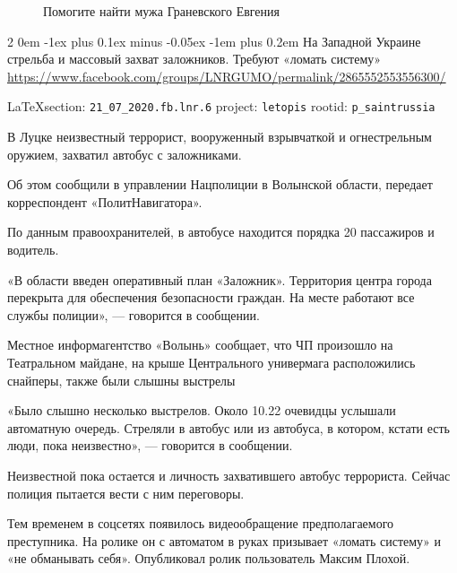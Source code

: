 \documentclass[a4paper,11pt]{extreport}
\makeatletter
\renewcommand\subsection{%
  \clearpage
    \@startsection{subsection}%
    {2}%
    {0em}%
    {-1ex plus 0.1ex minus -0.05ex}%
    {-1em plus 0.2em}%
    {\scshape\bfseries\Large}%
}
\makeatother
\begin{document}
\begin{figure}[ht]
 \centering
 \caption{Помогите найти мужа Граневского Евгения}
 \label{fig:}
\end{figure}
 
 
\subsection{На Западной Украине стрельба и массовый захват заложников. Требуют «ломать систему»}
\label{sec:21_07_2020.fb.lnr.6}
\url{https://www.facebook.com/groups/LNRGUMO/permalink/2865552553556300/}
  
\vspace{0.5cm}
{\small\LaTeX section: \verb|21_07_2020.fb.lnr.6| project: \verb|letopis| rootid: \verb|p_saintrussia|}
\vspace{0.5cm}


В Луцке неизвестный террорист, вооруженный взрывчаткой и огнестрельным оружием,
захватил автобус с заложниками.

Об этом сообщили в управлении Нацполиции в Волынской области, передает
корреспондент «ПолитНавигатора».

По данным правоохранителей, в автобусе находится порядка 20 пассажиров и
водитель.

«В области введен оперативный план «Заложник». Территория центра города
перекрыта для обеспечения безопасности граждан. На месте работают все службы
полиции», --- говорится в сообщении.

Местное информагентство «Волынь» сообщает, что ЧП произошло на Театральном
майдане, на крыше Центрального универмага расположились снайперы, также были
слышны выстрелы

«Было слышно несколько выстрелов. Около 10.22 очевидцы услышали автоматную
очередь. Стреляли в автобус или из автобуса, в котором, кстати есть люди, пока
неизвестно», --- говорится в сообщении.

Неизвестной пока остается и личность захватившего автобус террориста. Сейчас
полиция пытается вести с ним переговоры.

Тем временем в соцсетях появилось видеообращение предполагаемого преступника.
На ролике он с автоматом в руках призывает «ломать систему» и «не обманывать
себя». Опубликовал ролик пользователь Максим Плохой.
\end{document}
